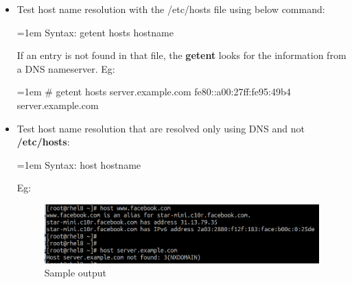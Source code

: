\begin{flushleft}
\begin{itemize}
	\item Test host name resolution with the /etc/hosts file using below command:
	\bigskip
		\begin{tcolorbox}[breakable,notitle,boxrule=-0pt,colback=pink,colframe=pink]
		\color{black}
		\font=1em
		Syntax: getent hosts hostname
		\font=4pt
	\end{tcolorbox}
	If an entry is not found in that file, the \textbf{getent} looks for the information from a DNS
	nameserver.
	\newline
	Eg:
	\bigskip
	\begin{tcolorbox}[breakable,notitle,boxrule=-0pt,colback=black,colframe=black]
		\color{green}
		\font=1em
		\# getent hosts server.example.com
		\newline
		\color{white}
		fe80::a00:27ff:fe95:49b4 server.example.com
		\font=4pt
	\end{tcolorbox}
	\newpage
	\item Test host name resolution that are resolved only using DNS and not \textbf{/etc/hosts}:
	\bigskip
	\begin{tcolorbox}[breakable,notitle,boxrule=-0pt,colback=pink,colframe=pink]
		\color{black}
		\font=1em
		Syntax: host hostname
		\font=4pt
	\end{tcolorbox}
	Eg:
	\bigskip
	\begin{figure}[h!]
		\centering
		\includegraphics[scale=.35]{content/chapter14/images/hosts2.png}
		\caption{Sample output}
		\label{fig:hosts2}
	\end{figure}		

	
\end{itemize}



\end{flushleft}
\newpage


